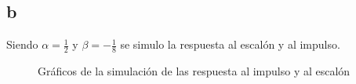 \documentclass[../../guia1.tex]{subfiles}
\begin{document}
\subsection{b}
Siendo $\alpha = \frac{1}{2}$ y $\beta = -\frac{1}{8}$ se simulo la respuesta al escalón y al impulso.
\begin{figure}[H]
 \centering

 \caption{Gráficos de la simulación de las respuesta al impulso y al escalón}
 \label{f:ejb}
\end{figure}
\end{document}
